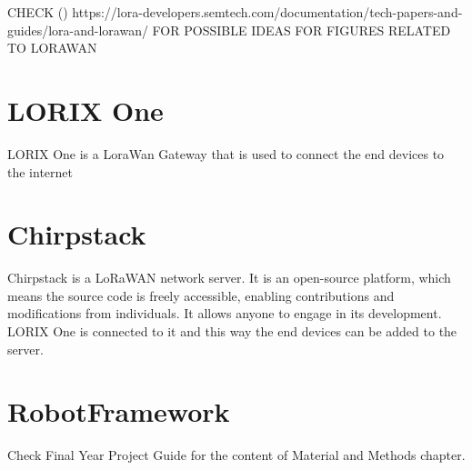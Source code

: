 CHECK  (\cite{}) https://lora-developers.semtech.com/documentation/tech-papers-and-guides/lora-and-lorawan/ FOR POSSIBLE IDEAS FOR FIGURES RELATED TO LORAWAN

\section{LORIX One}
LORIX One is a LoraWan Gateway that is used to connect the end devices to the internet
\section{Chirpstack}
    Chirpstack is a LoRaWAN network server. It is an open-source platform, which means the source code is freely accessible, enabling contributions and modifications from individuals. It allows anyone to engage in its development. LORIX One is connected to it and this way the end devices can be added to the server.
\section{RobotFramework}



Check Final Year Project Guide for the content of Material and Methods chapter.

\clearpage %
